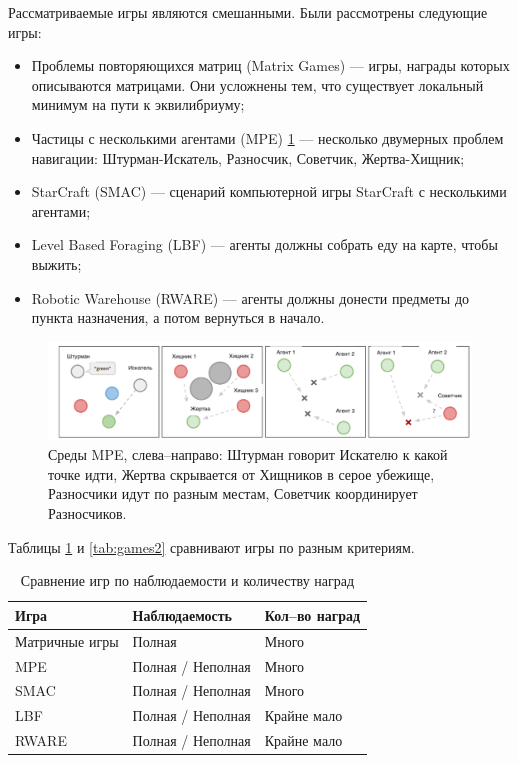 Рассматриваемые игры являются смешанными.
Были рассмотрены следующие игры:
\begin{itemize}[label=---]
	\item Проблемы повторяющихся матриц (Matrix Games) --- игры, награды которых описываются матрицами. Они усложнены тем, что существует локальный минимум на пути к эквилибриуму;
	\item Частицы с несколькими агентами (MPE) \ref{fig:mpe} --- несколько двумерных проблем навигации: Штурман-Искатель, Разносчик, Советчик, \newline Жертва-Хищник;
	\item StarCraft (SMAC) --- сценарий компьютерной игры StarCraft с несколькими агентами;
	\item Level Based Foraging (LBF) --- агенты должны собрать еду на карте, чтобы выжить;
	\item Robotic Warehouse (RWARE) --- агенты должны донести предметы до пункта назначения, а потом вернуться в начало.
\end{itemize}

\begin{figure}[H]
	\begin{center}
	\includegraphics[pages=-, width=140mm]{./inc/img/mpe.png}
	\caption{Среды MPE, слева--направо: Штурман говорит Искателю к какой точке идти, Жертва скрывается от Хищников в серое убежище, Разносчики идут по разным местам, Советчик координирует Разносчиков.}
	\label{fig:mpe}
\end{center}
\end{figure}

Таблицы \ref{tab:games1} и \ref{tab:games2} сравнивают игры по разным критериям.

\begin{table}[H]
	\centering
	\caption{Сравнение игр по наблюдаемости и количеству наград}
	\label{tab:games1}
	\begin{tabular}{@{}|l|l|l|@{}}
	\toprule
	Игра   & Наблюдаемость     & Кол--во наград \\ \midrule
	Матричные игры & Полная            & Много         \\
	MPE            & Полная / Неполная & Много         \\
	SMAC           & Полная / Неполная & Много         \\
	LBF            & Полная / Неполная & Крайне мало   \\
	RWARE          & Полная / Неполная & Крайне мало   \\ \bottomrule
	\end{tabular}
\end{table}

